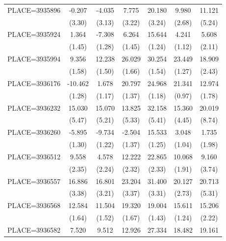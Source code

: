 {\begin{tabular}{l*{6}{c}}
PLACE=3935896       &      -0.207&      -4.035&       7.775&      20.180&       9.980&      11.121\\
                    &      (3.30)&      (3.13)&      (3.22)&      (3.24)&      (2.68)&      (5.24)\\
PLACE=3935924       &       1.364&      -7.308&       6.264&      15.644&       4.241&       5.608\\
                    &      (1.45)&      (1.28)&      (1.45)&      (1.24)&      (1.12)&      (2.11)\\
PLACE=3935994       &       9.356&      12.238&      26.029&      30.254&      23.449&      18.909\\
                    &      (1.58)&      (1.50)&      (1.66)&      (1.54)&      (1.27)&      (2.43)\\
PLACE=3936176       &     -10.462&       1.678&      20.797&      24.968&      21.341&      12.974\\
                    &      (1.28)&      (1.17)&      (1.37)&      (1.18)&      (0.97)&      (1.78)\\
PLACE=3936232       &      15.030&      15.070&      13.825&      32.158&      15.360&      20.019\\
                    &      (5.47)&      (5.21)&      (5.33)&      (5.41)&      (4.45)&      (8.74)\\
PLACE=3936260       &      -5.895&      -9.734&      -2.504&      15.533&       3.048&       1.735\\
                    &      (1.30)&      (1.22)&      (1.37)&      (1.25)&      (1.04)&      (1.98)\\
PLACE=3936512       &       9.558&       4.578&      12.222&      22.865&      10.068&       9.160\\
                    &      (2.35)&      (2.24)&      (2.32)&      (2.33)&      (1.91)&      (3.74)\\
PLACE=3936557       &      16.886&      16.801&      23.204&      31.400&      20.127&      20.713\\
                    &      (3.38)&      (3.21)&      (3.37)&      (3.31)&      (2.73)&      (5.31)\\
PLACE=3936568       &      12.584&      11.504&      19.320&      19.004&      15.611&      15.206\\
                    &      (1.64)&      (1.52)&      (1.67)&      (1.43)&      (1.24)&      (2.22)\\
PLACE=3936582       &       7.520&       9.512&      12.926&      27.334&      18.482&      19.161\\

\end{tabular}}

